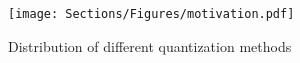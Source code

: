     
    \begin{figure}[t]
        \centering
        \setlength{\abovecaptionskip}{5pt}   %
        \setlength{\belowcaptionskip}{0pt}   %
        \texttt{[image: Sections/Figures/motivation.pdf]}
        \caption{Distribution of different quantization methods}
    \label{fig:motivation}
    \end{figure}


